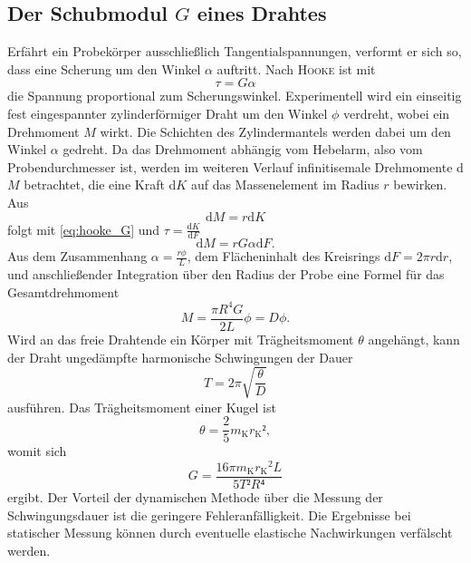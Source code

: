 \subsection{Der Schubmodul \texorpdfstring{$G$}{G} eines Drahtes}
Erfährt ein Probekörper ausschließlich Tangentialspannungen, verformt er sich so, dass eine Scherung um den Winkel $\alpha$ auftritt. Nach \textsc{Hooke} ist mit
\begin{equation}
\tau=G\alpha
\label{eq:hooke_G}
\end{equation}
 die Spannung proportional zum Scherungswinkel. 
Experimentell wird ein einseitig fest eingespannter zylinderförmiger Draht um den Winkel $\phi$ verdreht, wobei ein Drehmoment $M$ wirkt. 
Die Schichten des Zylindermantels werden dabei um den Winkel $\alpha$ gedreht. 
Da das Drehmoment abhängig vom Hebelarm, also vom Probendurchmesser ist, werden im weiteren Verlauf infinitisemale Drehmomente d$M$ betrachtet, die eine Kraft d$K$ auf das Massenelement im Radius $r$ bewirken.
Aus
\begin{equation}
\mathup{d}M=r\mathup{d}K
\end{equation}
folgt mit \eqref{eq:hooke_G} und $\tau=\frac{\mathup{d}K}{\mathup{d}F}$
\begin{equation}
\mathup{d}M=rG\alpha\mathup{d}F.
\end{equation}
Aus dem Zusammenhang $\alpha=\frac{r\phi}{L}$, dem Flächeninhalt des Kreisrings $\mathup{d}F=2\pi r\mathup{d}r$, und anschließender Integration über den Radius der Probe eine Formel für das Gesamtdrehmoment
\begin{equation}
M=\frac{\pi R^4 G}{2L}\phi=D\phi.
\label{eq:Richtgrosse}
\end{equation}
Wird an das freie Drahtende ein Körper mit Trägheitsmoment $\theta$ angehängt, kann der Draht ungedämpfte harmonische Schwingungen der Dauer 
\begin{equation}
T=2\pi\sqrt{\frac{\theta}{D}}
\label{eq:t}
\end{equation}
 ausführen. %
 Das Trägheitsmoment einer Kugel ist
\begin{equation}
\theta=\frac{2}{5}m_\mathup{K}{r_\mathup{K}}²,
\label{eq:theta_k}
\end{equation}
 womit sich
\begin{equation}
G=\frac{16\pi m_\mathup{K} {r_\mathup{K}}^2 L}{5T²R⁴}
\label{eq:G}
\end{equation}
ergibt.
Der Vorteil der dynamischen Methode über die Messung der Schwingungsdauer ist die geringere Fehleranfälligkeit. Die Ergebnisse bei statischer Messung können durch eventuelle elastische Nachwirkungen verfälscht werden.

